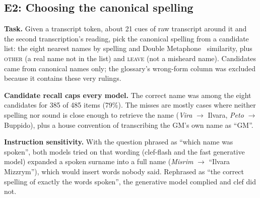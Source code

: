 \documentclass[11pt]{article}
\begin{document}
\subsection{E2: Choosing the canonical spelling}
\textbf{Task.} Given a transcript token, about 21 cues of raw transcript around it and the second
transcription's reading, pick the canonical spelling from a candidate list: the eight nearest names
by spelling and Double Metaphone~\cite{philips2000} similarity, plus \textsc{other} (a real name not
in the list) and \textsc{leave} (not a misheard name). Candidates came from canonical names only;
the glossary's wrong-form column was excluded because it contains these very rulings.

\textbf{Candidate recall caps every model.} The correct name was among the eight candidates for
385 of 485 items (79\%). The misses are mostly cases where neither spelling nor sound is close enough
to retrieve the name (\emph{Vira} $\rightarrow$ Ilvara, \emph{Peto} $\rightarrow$ Buppido), plus a
house convention of transcribing the GM's own name as ``GM''.

\textbf{Instruction sensitivity.} With the question phrased as ``which name was spoken'', both
models tried on that wording (clef-flash and the fast generative model) expanded a spoken surname into a full name (\emph{Misrim} $\rightarrow$ ``Ilvara Mizzrym''),
which would insert words nobody said. Rephrased as ``the correct spelling of exactly the words
spoken'', the generative model complied and clef did not.
\end{document}
